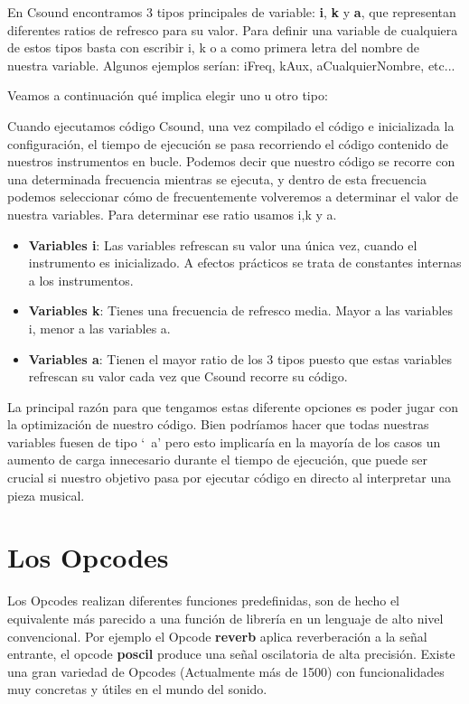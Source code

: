 En Csound encontramos 3 tipos principales de variable: \textbf{i}, \textbf{k} y \textbf{a}, que representan diferentes ratios de refresco para su valor. Para definir una variable de cualquiera de estos tipos basta con escribir i, k o a como primera letra del nombre de nuestra variable. Algunos ejemplos serían: iFreq, kAux, aCualquierNombre, etc...

Veamos a continuación qué implica elegir uno u otro tipo:

Cuando ejecutamos código Csound, una vez compilado el código e inicializada la configuración, el tiempo de ejecución se pasa recorriendo el código contenido de nuestros instrumentos en bucle. Podemos decir que nuestro código se recorre con una determinada frecuencia mientras se ejecuta, y dentro de esta frecuencia podemos seleccionar cómo de frecuentemente volveremos a determinar el valor de nuestra variables. Para determinar ese ratio usamos i,k y a.

\begin{itemize}
 \item \textbf{Variables i}: Las variables refrescan su valor una única vez, cuando el instrumento es inicializado. A efectos prácticos se trata de constantes internas a los instrumentos.
 
 \item \textbf{Variables k}: Tienes una frecuencia de refresco media. Mayor a las variables i, menor a las variables a.
 
 \item \textbf{Variables a}: Tienen el mayor ratio de los 3 tipos puesto que estas variables refrescan su valor cada vez que Csound recorre su código.

\end{itemize}

La principal razón para que tengamos estas diferente opciones es poder jugar con la optimización de nuestro código. Bien podríamos hacer que todas nuestras variables fuesen de tipo `\ a' pero esto implicaría en la mayoría de los casos un aumento de carga innecesario durante el tiempo de ejecución, que puede ser crucial si nuestro objetivo pasa por ejecutar código en directo al interpretar una pieza musical.

\section{Los Opcodes}\label{sec:Opcodes}

Los Opcodes realizan diferentes funciones predefinidas, son de hecho el equivalente más parecido a una función de librería en un lenguaje de alto nivel convencional. Por ejemplo el Opcode \textbf{reverb} aplica reverberación a la señal entrante, el opcode \textbf{poscil} produce una señal oscilatoria de alta precisión. Existe una gran variedad de Opcodes (Actualmente más de 1500) con funcionalidades muy concretas y útiles en el mundo del sonido.

